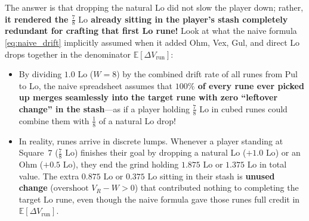 \documentclass[11pt,reqno]{amsart}
\theoremstyle{definition}
\begin{document}
The answer is that dropping the natural Lo did not slow the player down; rather, \textbf{it rendered the $\frac{7}{8}\text{ Lo}$ already sitting in the player's stash completely redundant for crafting that first Lo rune!} Look at what the naive formula \eqref{eq:naive_drift} implicitly assumed when it added Ohm, Vex, Gul, and direct Lo drops together in the denominator $\mathbb{E}[\Delta V_{\text{run}}]$:
\begin{itemize}
    \item By dividing $1.0\text{ Lo}$ ($W = 8$) by the combined drift rate of all runes from Pul to Lo, the naive spreadsheet assumes that \textbf{$100\%$ of every rune ever picked up merges seamlessly into the target rune with zero ``leftover change'' in the stash}—as if a player holding $\frac{7}{8}\text{ Lo}$ in cubed runes could combine them with $\frac{1}{8}$ of a natural Lo drop!
    \item In reality, runes arrive in discrete lumps. Whenever a player standing at Square~$7$ ($\frac{7}{8}\text{ Lo}$) finishes their goal by dropping a natural Lo ($+1.0\text{ Lo}$) or an Ohm ($+0.5\text{ Lo}$), they end the grind holding $1.875\text{ Lo}$ or $1.375\text{ Lo}$ in total value. The extra $0.875\text{ Lo}$ or $0.375\text{ Lo}$ sitting in their stash is \textbf{unused change} ($\text{overshoot } V_R - W > 0$) that contributed nothing to completing the target Lo rune, even though the naive formula gave those runes full credit in $\mathbb{E}[\Delta V_{\text{run}}]$.
\end{itemize}
\end{document}
